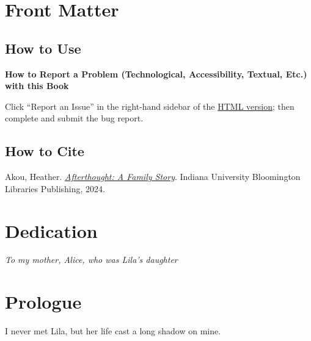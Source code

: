 \documentclass[
  letterpaper,
]{book}
\renewcommand*\contentsname{Table of contents}
\newcommand\contentsname{Table of contents}
\begin{document}

\renewcommand*\contentsname{Table of Contents}
{
\hypersetup{linkcolor=blue}
\setcounter{tocdepth}{2}
\tableofcontents
}
\listoffigures

\mainmatter
{}

\chapter{Front Matter}\label{front-matter}

\section{How to Use}\label{how-to-use}

\textbf{How to Report a Problem (Technological, Accessibility, Textual,
Etc.) with this Book}

Click ``Report an Issue'' in the right-hand sidebar of the
\href{https://iulibscholcomm.github.io/afterthought/}{HTML version};
then complete and submit the bug report.

\section{How to Cite}\label{how-to-cite}

Akou, Heather.
\href{https://doi.org/10.5967/rc90-k143}{\emph{Afterthought: A Family
Story}}. Indiana University Bloomington Libraries Publishing, 2024.


\chapter{Dedication}\label{dedication}

\emph{To my mother, Alice, who was Lila's daughter}


\chapter{Prologue}\label{prologue}

I never met Lila, but her life cast a long shadow on mine.
\end{document}
